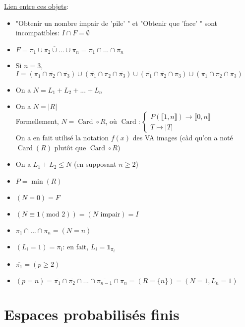 \documentclass[10pt,a4paper]{article}
\theoremstyle{definition}
\DeclareMathOperator{\card}{Card}
\begin{document}
\noindent \uline{Lien entre ces objets}:
\begin{itemize}
\item "Obtenir un nombre impair de 'pile' " et "Obtenir que 'face' " sont incompatibles: $I \cap F = \emptyset$
\item $F = \overline{\pi_1 \cup \pi_2 \cup ... \cup \pi_n} = \overline{\pi_1} \cap ... \cap \overline{\pi_n}$
\item Si $n = 3$, $I = (\pi_1 \cap \overline{\pi_2} \cap \overline{\pi_3}) \cup (\overline{\pi_1} \cap \pi_2 \cap \overline{\pi_3}) \cup (\overline{\pi_1} \cap \overline{\pi_2} \cap \pi_3) \cup (\pi_1 \cap \pi_2 \cap \pi_3)$
\item On a $N = L_1 + L_2 + ... + L_n$
\item On a $N = \left| R \right|$ \\
Formellement, $N = \card \circ R$, où $\card: \begin{cases}
P(\llbracket 1, n \rrbracket) \to \llbracket 0, n \rrbracket \\
T \mapsto \left| T \right|
\end{cases}$ \\
On a en fait utilisé la notation $f(x)$ des VA images (càd qu'on a noté $\card(R)$ plutôt que $\card \circ R$)
\item On a $L_1 + L_2 \leq N$ (en supposant $n \geq 2$)
\item $P = \min(R)$
\item $(N = 0) = F$
\item $(N \equiv 1 (\text{mod }2)) = (N \text{ impair}) = I$
\item $\pi_1 \cap ... \cap \pi_n = (N = n)$
\item $(L_i = 1) = \pi_i$: en fait, $L_i = \mathds{1}_{\pi_i}$
\item $\overline{\pi_1} = (p \geq 2)$
\item $(p = n) = \overline{\pi_1} \cap \overline{\pi_2} \cap ... \cap \overline{\pi_{n - 1}} \cap \pi_n = (R = \{ n \}) = (N = 1, L_n = 1)$
\end{itemize}

\section{Espaces probabilisés finis}
\end{document}
